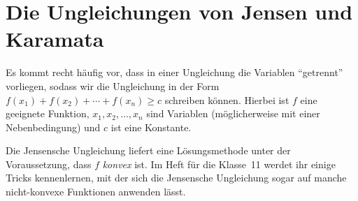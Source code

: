 \section{Die Ungleichungen von Jensen und Karamata}\label{kapitel:Jensen}
Es kommt recht häufig vor, dass in einer Ungleichung die Variablen \enquote{getrennt} vorliegen, sodass wir die Ungleichung in der Form $f(x_1)+f(x_2)+\dotsb+f(x_n)\geqslant c$ schreiben können. Hierbei ist $f$ eine geeignete Funktion, $x_1,x_2,\dotsc,x_n$ sind Variablen (möglicherweise mit einer Nebenbedingung) und $c$ ist eine Konstante.

Die Jensensche Ungleichung liefert eine Lösungsmethode unter der Voraussetzung, dass $f$ \emph{konvex} ist. Im Heft für die Klasse~11 werdet ihr einige Tricks kennenlernen, mit der sich die Jensensche Ungleichung sogar auf manche nicht-konvexe Funktionen anwenden lässt.

